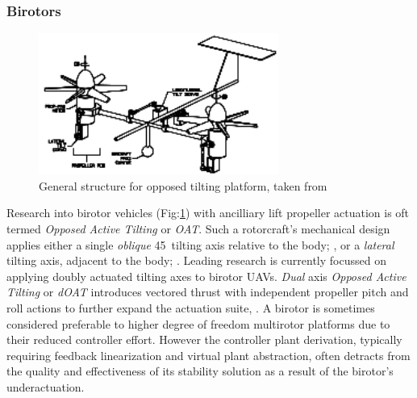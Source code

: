 \subsubsection*{Birotors}
\begin{figure}[hbtp]
\centering
\includegraphics[width=0.7\textwidth]{figs/dualaxistilt}
\caption{General structure for opposed tilting platform, taken from\cite{gres2007}}
\label{fig:dualaxistilt}
\end{figure}
Research into birotor vehicles (Fig:\ref{fig:dualaxistilt}) with ancilliary lift propeller actuation is oft termed \emph{Opposed Active Tilting} or \emph{OAT}. Such a rotorcraft's mechanical design applies either a single \emph{oblique} 45\textdegree ~tilting axis relative to the body; \cite{smalltwotilting,obliquepitch}, or a \emph{lateral} tilting axis, adjacent to the body; \cite{tiltrotorUAV,adaptivebackstep,tiltrotorcontrol,tpheonix}. Leading research is currently focussed on applying doubly actuated tilting axes to birotor UAVs. \emph{Dual} axis \emph{Opposed Active Tilting} or \emph{dOAT} introduces vectored thrust with independent propeller pitch and roll actions to further expand the actuation suite, \cite{gres2007,opposedlateraldualaxis}. A birotor is sometimes considered preferable to higher degree of freedom multirotor platforms due to their reduced controller effort. However the controller plant derivation, typically requiring feedback linearization and virtual plant abstraction, often detracts from the quality and effectiveness of its stability solution as a result of the birotor's underactuation. 
\par
